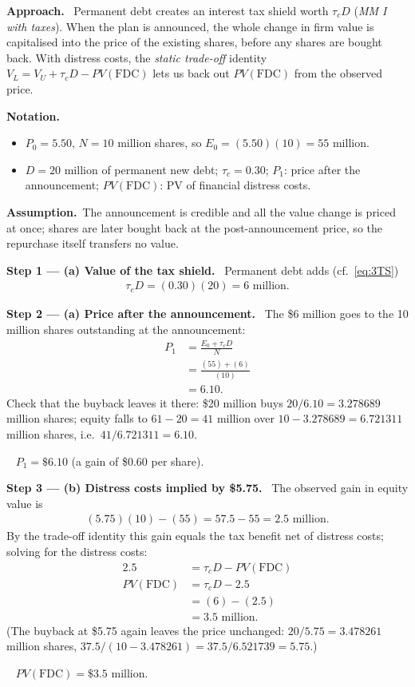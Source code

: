 \documentclass[11pt,a4paper]{article}
\numberwithin{equation}{section}
\newcommand{\notation}{\par\smallskip\noindent\textbf{Notation.}}
\newcommand{\step}[2]{\par\smallskip\noindent\textbf{Step #1 --- #2.}~}
\newcommand{\assumption}{\par\smallskip\noindent\textbf{Assumption.}~}
\newcommand{\approach}{\par\smallskip\noindent\textbf{Approach.}~}
\newcommand{\answer}[1]{\par\smallskip\noindent\fbox{\textbf{Answer #1.}}~}
\begin{document}
\approach
Permanent debt creates an interest tax shield worth $\tau_c D$ (\emph{MM I with taxes}). When the
plan is announced, the whole change in firm value is capitalised into the price of the existing
shares, before any shares are bought back. With distress costs, the \emph{static trade-off}
identity $V_L=V_U+\tau_c D-\mathit{PV}(\text{FDC})$ lets us back out $\mathit{PV}(\text{FDC})$ from
the observed price.

\notation
\begin{itemize}
  \item $P_0=5.50$, $N=10$ million shares, so $E_0=(5.50)(10)=55$ million.
  \item $D=20$ million of permanent new debt; $\tau_c=0.30$; $P_1$: price after the announcement; $\mathit{PV}(\text{FDC})$: PV of financial distress costs.
\end{itemize}

\assumption The announcement is credible and all the value change is priced at once; shares are
later bought back at the post-announcement price, so the repurchase itself transfers no value.

\step{1}{(a) Value of the tax shield} Permanent debt adds (cf.\ \eqref{eq:3TS})
\begin{align}
  \tau_c D = (0.30)(20) = 6 \text{ million}. \nonumber
\end{align}

\step{2}{(a) Price after the announcement} The \$6 million goes to the 10 million shares
outstanding at the announcement:
\begin{align}
  P_1 &= \frac{E_0+\tau_c D}{N} \label{eq:8P1}\\
      &= \frac{(55)+(6)}{(10)} \nonumber\\
      &= 6.10. \nonumber
\end{align}
Check that the buyback leaves it there: \$20 million buys $20/6.10=3.278689$ million shares;
equity falls to $61-20=41$ million over $10-3.278689=6.721311$ million shares, i.e.\
$41/6.721311=6.10$.
\answer{(a)} $P_1=\$6.10$ (a gain of \$0.60 per share).

\step{3}{(b) Distress costs implied by \$5.75} The observed gain in equity value is
\begin{align}
  (5.75)(10)-(55) = 57.5-55 = 2.5 \text{ million}. \nonumber
\end{align}
By the trade-off identity this gain equals the tax benefit net of distress costs; solving for
the distress costs:
\begin{align}
  2.5 &= \tau_c D-\mathit{PV}(\text{FDC}) \nonumber\\
  \mathit{PV}(\text{FDC}) &= \tau_c D - 2.5 \nonumber\\
      &= (6)-(2.5) \nonumber\\
      &= 3.5 \text{ million}. \label{eq:8FDC}
\end{align}
(The buyback at \$5.75 again leaves the price unchanged: $20/5.75=3.478261$ million shares,
$37.5/(10-3.478261)=37.5/6.521739=5.75$.)
\answer{(b)} $\mathit{PV}(\text{FDC})=\$3.5$ million.
\end{document}
